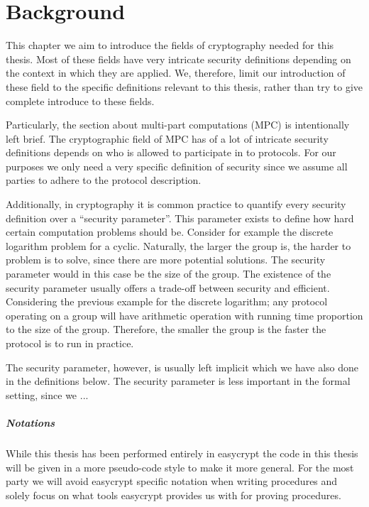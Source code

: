 \chapter{Background}
\label{ch:background}
This chapter we aim to introduce the fields of cryptography needed for this
thesis.
Most of these fields have very intricate security definitions depending on the
context in which they are applied.
We, therefore, limit our introduction of these field to the specific definitions
relevant to this thesis, rather than try to give complete introduce to these fields.

Particularly, the section about multi-part computations (MPC) is intentionally left brief. The
cryptographic field of MPC has of a lot of intricate security definitions
depends on who is allowed to participate in to protocols. For our purposes we
only need a very specific definition of security since we assume all parties to
adhere to the protocol description.

Additionally, in cryptography it is common practice to quantify every security
definition over a ``security parameter''. This parameter exists to define how
hard certain computation problems should be. Consider for example the discrete
logarithm problem for a cyclic. Naturally, the larger the group is,
the harder to problem is to solve, since there are more potential solutions. The
security parameter would in this case be the size of the group.
The existence of the security parameter usually offers a trade-off between
security and efficient. Considering the previous example for the discrete
logarithm; any protocol operating on a group will have arithmetic operation
with running time proportion to the size of the group. Therefore, the smaller
the group is the faster the protocol is to run in practice.

The security parameter, however, is usually left implicit which we have also
done in the definitions below. The security parameter is less important in the
formal setting, since we ...




\paragraph{Notations}
While this thesis has been performed entirely in easycrypt the code in this
thesis will be given in a more pseudo-code style to make it more general. For
the most party we will avoid easycrypt specific notation when writing procedures
and solely focus on what tools easycrypt provides us with for proving
procedures.

